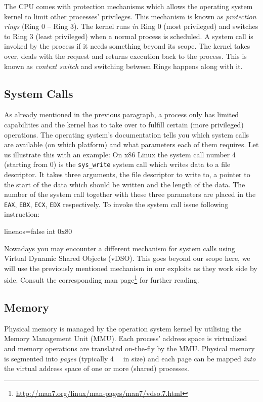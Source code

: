 \documentclass[article]{uibk}
\begin{document}
The CPU comes with protection mechanisms which allows the operating system
kernel to limit other processes' privileges. This mechanism is known as
\textit{protection rings} (Ring 0 -- Ring 3). The kernel runs \emph{in} Ring 0
(most privileged) and switches to Ring 3 (least privileged) when a normal
process is scheduled. A system call is invoked by the process if it needs
something beyond its scope. The kernel takes over, deals with the request and
returns execution back to the process. This is known as \textit{context switch}
and switching between Rings happens along with it.

\subsection{System Calls}

As already mentioned in the previous paragraph, a process only has limited
capabilities and the kernel has to take over to fulfill certain (more
privileged) operations. The operating system's documentation tells you which
system calls are available (on which platform) and what parameters
each of them requires. Let us illustrate this with an example: On x86 Linux the
system call
number 4 (starting from 0) is the \texttt{sys\_write} system call which writes
data to a file descriptor. It takes three arguments, the file descriptor to
write to, a pointer to the start of the data which should be written and the
length of the data. The number of the system call together with these three
parameters are placed in the \texttt{EAX}, \texttt{EBX}, \texttt{ECX},
\texttt{EDX} respectively. To invoke the system call issue following
instruction:

\begin{nasmcode*}{linenos=false}
    int     0x80
\end{nasmcode*}

Nowadays you may encounter a different mechanism for system calls using Virtual
Dynamic Shared Objects (vDSO). This goes beyond our scope here, we will use the
previously mentioned mechanism in our exploits as they work side by side.
Consult the corresponding man
page\footnote{\url{http://man7.org/linux/man-pages/man7/vdso.7.html}} for
further reading.

\subsection{Memory}

Physical memory is managed by the operation system kernel by utilising the
Memory Management Unit (MMU). Each process' address space is virtualized and
memory operations are translated on-the-fly by the MMU. Physical memory is
segmented into \textit{pages} (typically \SI{4}{\kibi\byte} in size) and each
page can be mapped \emph{into} the virtual address space of one or more
(shared) processes.~\cite[pp.~400]{unix_interals}
\end{document}
